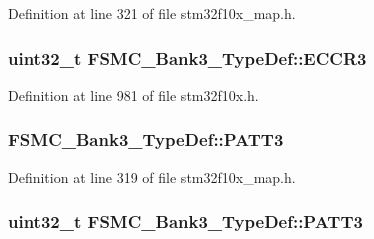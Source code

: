 Definition at line 321 of file stm32f10x\+\_\+map.\+h.

\subsubsection[{\texorpdfstring{E\+C\+C\+R3}{ECCR3}}]{ {\bf uint32\+\_\+t} F\+S\+M\+C\+\_\+\+Bank3\+\_\+\+Type\+Def\+::\+E\+C\+C\+R3}\hypertarget{struct_f_s_m_c___bank3___type_def_a6935beb5bbc2de668024c1989eecd46c}{}\label{struct_f_s_m_c___bank3___type_def_a6935beb5bbc2de668024c1989eecd46c}


Definition at line 981 of file stm32f10x.\+h.

\subsubsection[{\texorpdfstring{P\+A\+T\+T3}{PATT3}}]{ F\+S\+M\+C\+\_\+\+Bank3\+\_\+\+Type\+Def\+::\+P\+A\+T\+T3}\hypertarget{struct_f_s_m_c___bank3___type_def_a2a968a8a83b56c11e82d4ebd0f63051f}{}\label{struct_f_s_m_c___bank3___type_def_a2a968a8a83b56c11e82d4ebd0f63051f}


Definition at line 319 of file stm32f10x\+\_\+map.\+h.

\subsubsection[{\texorpdfstring{P\+A\+T\+T3}{PATT3}}]{ {\bf uint32\+\_\+t} F\+S\+M\+C\+\_\+\+Bank3\+\_\+\+Type\+Def\+::\+P\+A\+T\+T3}\hypertarget{struct_f_s_m_c___bank3___type_def_a0cbf1b4647f98914238202828de47416}{}\label{struct_f_s_m_c___bank3___type_def_a0cbf1b4647f98914238202828de47416}


